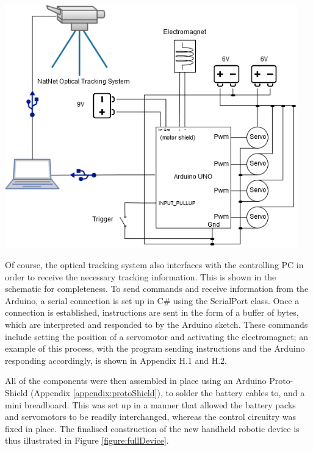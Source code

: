 \documentclass[11pt]{article}
\begin{document}
\begin{center}
\includegraphics[width=0.95\textwidth]{images/newSchematic.png}
\label{figure:schematic}
\end{center}

Of course, the optical tracking system also interfaces with the controlling PC in order to receive the necessary tracking information. This is shown in the schematic for completeness. To send commands and receive information from the Arduino, a serial connection is set up in C\# using the SerialPort class. Once a connection is established, instructions are sent in the form of a buffer of bytes, which are interpreted and responded to by the Arduino sketch. These commands include setting the position of a servomotor and activating the electromagnet; an example of this process, with the program sending instructions and the Arduino responding accordingly, is shown in Appendix H.1 and H.2.

All of the components were then assembled in place using an Arduino Proto-Shield (Appendix \ref{appendix:protoShield}), to solder the battery cables to, and a mini breadboard. This was set up in a manner that allowed the battery packs and servomotors to be readily interchanged, whereas the control circuitry was fixed in place. The finalised construction of the new handheld robotic device is thus illustrated in Figure \ref{figure:fullDevice}.
\end{document}
